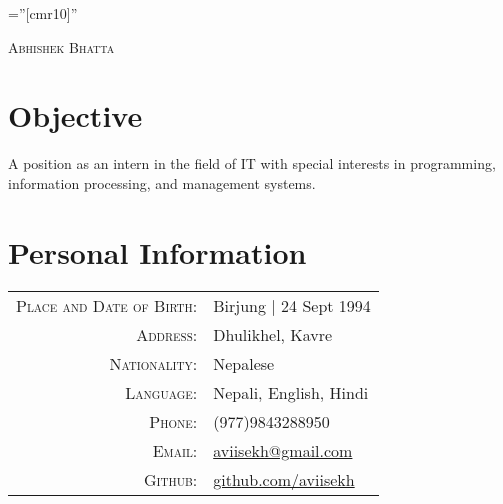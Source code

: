 \documentclass[a4paper,10pt]{article}
\begin{document}

\pagestyle{empty} %

\font\fb=''[cmr10]'' %

\par{\centering
		{\huge \textsc{Abhishek Bhatta}
	}\bigskip\par}

\section{Objective}
A position as an intern in the field of IT with special interests in programming, information processing, and management systems.

\section{Personal Information}

\begin{tabular}{rl}
    \textsc{Place and Date of Birth:} & Birjung  | 24 Sept 1994 \\
    \textsc{Address:}   & Dhulikhel, Kavre \\
    \textsc{Nationality:} & Nepalese\\
    \textsc{Language:} & Nepali, English, Hindi\\
    \textsc{Phone:}     & (977)9843288950\\
    \textsc{Email:}     & \href{mailto:aviisekh@gmail.com}{aviisekh@gmail.com}\\
    \textsc{Github:} & \href{https://www.github.com/aviisekh}{github.com/aviisekh}\\
\end{tabular}

\end{document}

